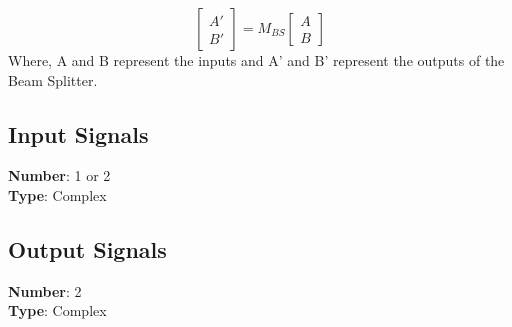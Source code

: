 \begin{equation}
\begin{bmatrix}
A' \\
B'
\end{bmatrix}=M_{BS} \dot{}{\begin{bmatrix}
			  				     A \\
			  	                 B
			  	                 \end{bmatrix}}
\end{equation}
Where, A and B represent the inputs and A' and B' represent the outputs of the Beam Splitter.

\subsection*{Input Signals}

\textbf{Number}: 1 or 2\\
\textbf{Type}: Complex

\subsection*{Output Signals}

\textbf{Number}: 2\\
\textbf{Type}: Complex





%
%
%
%
%

